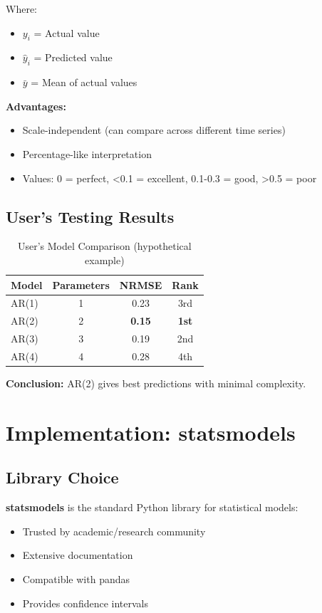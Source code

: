 Where:
\begin{itemize}
    \item $y_i$ = Actual value
    \item $\hat{y}_i$ = Predicted value
    \item $\bar{y}$ = Mean of actual values
\end{itemize}

\textbf{Advantages:}
\begin{itemize}
    \item Scale-independent (can compare across different time series)
    \item Percentage-like interpretation
    \item Values: 0 = perfect, <0.1 = excellent, 0.1-0.3 = good, >0.5 = poor
\end{itemize}

\subsection{User's Testing Results}

\begin{table}[H]
\centering
\begin{tabular}{lccc}
\toprule
\textbf{Model} & \textbf{Parameters} & \textbf{NRMSE} & \textbf{Rank} \\
\midrule
AR(1) & 1 & 0.23 & 3rd \\
AR(2) & 2 & \textbf{0.15} & \textbf{1st} \\
AR(3) & 3 & 0.19 & 2nd \\
AR(4) & 4 & 0.28 & 4th \\
\bottomrule
\end{tabular}
\caption{User's Model Comparison (hypothetical example)}
\end{table}

\textbf{Conclusion:} AR(2) gives best predictions with minimal complexity.

\section{Implementation: statsmodels}

\subsection{Library Choice}

\textbf{statsmodels} is the standard Python library for statistical models:
\begin{itemize}
    \item Trusted by academic/research community
    \item Extensive documentation
    \item Compatible with pandas
    \item Provides confidence intervals
\end{itemize}


